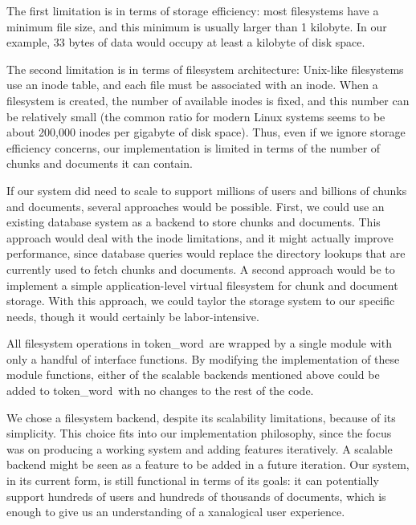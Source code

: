 \documentclass{acm_proc_article-sp}
\newcommand{\tw}{token\_word}
\begin{document}
The first limitation is in terms of storage efficiency:  most filesystems have a minimum file size, and this minimum is usually larger than 1 kilobyte.
In our example, 33 bytes of data would occupy at least a kilobyte of disk space.

The second limitation is in terms of filesystem architecture:  Unix-like filesystems use an inode table, and each file must be associated with an inode.
When a filesystem is created, the number of available inodes is fixed, and this number can be relatively small (the common ratio for modern Linux systems seems to be about 200,000 inodes per gigabyte of disk space). \cite{OperatingSystems}
Thus, even if we ignore storage efficiency concerns, our implementation is limited in terms of the number of chunks and documents it can contain.

If our system did need to scale to support millions of users and billions of chunks and documents, several approaches would be possible.
First, we could use an existing database system as a backend to store chunks and documents.
This approach would deal with the inode limitations, and it might actually improve performance, since database queries would replace the directory lookups that are currently used to fetch chunks and documents.
A second approach would be to implement a simple application-level virtual filesystem for chunk and document storage.
With this approach, we could taylor the storage system to our specific needs, though it would certainly be labor-intensive.

All filesystem operations in \tw \  are wrapped by a single module with only a handful of interface functions.
By modifying the implementation of these module functions, either of the scalable backends mentioned above could be added to \tw \  with no changes to the rest of the code. 

We chose a filesystem backend, despite its scalability limitations, because of its simplicity.
This choice fits into our implementation philosophy, since the focus was on producing a working system and adding features iteratively.
A scalable backend might be seen as a feature to be added in a future iteration.
Our system, in its current form, is still functional in terms of its goals:  it can potentially support hundreds of users and hundreds of thousands of documents, which is enough to give us an understanding of a xanalogical user experience.


\end{document}
